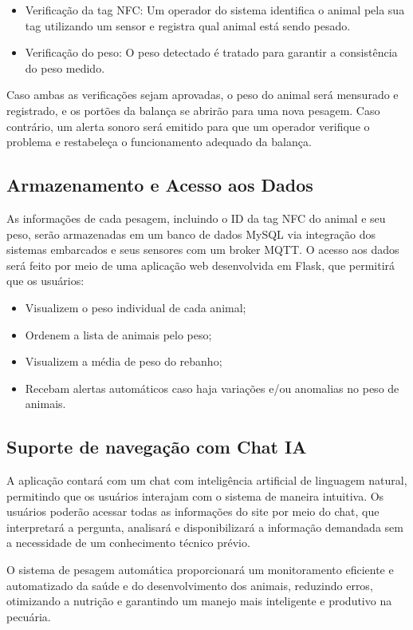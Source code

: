 \documentclass[11pt]{article}
\begin{document}
\begin{itemize}
    \item Verificação da tag NFC: Um operador do sistema identifica o animal pela sua tag utilizando um sensor e registra qual animal está sendo pesado.
    \item Verificação do peso: O peso detectado é tratado para garantir a consistência do peso medido.
\end{itemize}

Caso ambas as verificações sejam aprovadas, o peso do animal será mensurado e registrado, e os portões da balança se abrirão para uma nova pesagem. Caso contrário, um alerta sonoro será emitido para que um operador verifique o problema e restabeleça o funcionamento adequado da balança.

\subsection{Armazenamento e Acesso aos Dados}
As informações de cada pesagem, incluindo o ID da tag NFC do animal e seu peso, serão armazenadas em um banco de dados MySQL via integração dos sistemas embarcados e seus sensores com um broker MQTT. O acesso aos dados será feito por meio de uma aplicação web desenvolvida em Flask, que permitirá que os usuários:

\begin{itemize}
    \item Visualizem o peso individual de cada animal;
    \item Ordenem a lista de animais pelo peso;
    \item Visualizem a média de peso do rebanho;
    \item Recebam alertas automáticos caso haja variações e/ou anomalias no peso de animais.
\end{itemize}

\subsection{Suporte de navegação com Chat IA}
A aplicação contará com um chat com inteligência artificial de linguagem natural, permitindo que os usuários interajam com o sistema de maneira intuitiva. Os usuários poderão acessar todas as informações do site por meio do chat, que interpretará a pergunta, analisará e disponibilizará a informação demandada sem a necessidade de um conhecimento técnico prévio.

O sistema de pesagem automática proporcionará um monitoramento eficiente e automatizado da saúde e do desenvolvimento dos animais, reduzindo erros, otimizando a nutrição e garantindo um manejo mais inteligente e produtivo na pecuária.
\end{document}
